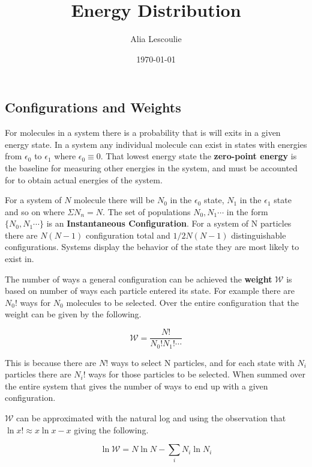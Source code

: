\documentclass[a4paper, 12 pt]{article}
\author{Alia Lescoulie}
\title{\vspace{-1.5cm}Energy Distribution}
\date{\today}
\begin{document}
\maketitle
\begin{flushleft}
\section{Configurations and Weights}

For molecules in a system there is a probability that is will exits in a given energy state. In a system any individual molecule can exist in states with energies from $\epsilon_0$ to $\epsilon_1$ where $\epsilon_0 \equiv 0$. That lowest energy state the \textbf{zero-point energy} is the baseline for measuring other energies in the system, and must be accounted for to obtain actual energies of the system.

For a system of $N$ molecule there will be $N_0$ in the $\epsilon_0$ state, $N_1$ in the $\epsilon_1$ state and so on where $\Sigma N_n = N$. The set of populations $N_0, N_1 \cdots$ in the form $\{ N_0, N_1 \cdots \}$ is an \textbf{Instantaneous Configuration}. For a system of N particles there are $N(N - 1)$ configuration total and $1/2 N(N - 1)$ distinguishable configurations. Systems display the behavior of the state they are most likely to exist in.

The number of ways a general configuration can be achieved the \textbf{weight} $\mathscr{W}$ is based on number of ways each particle entered its state. For example there are $N_0 !$ ways for $N_0$ molecules to be selected. Over the entire configuration that the weight can be given by the following.

\begin{equation*}
    \mathscr{W} = \frac{N!}{N_0 ! N_1 ! \cdots}
\end{equation*}

This is because there are $N!$ ways to select N particles, and for each state with $N_i$ particles there are $N_i !$ ways for those particles to be selected. When summed over the entire system that gives the number of ways to end up with a given configuration.

$\mathscr{W}$ can be approximated with the natural log and using the observation that $\ln{x!} \approx x\ln{x} - x$ giving the following.

\begin{equation*}
    \ln{\mathscr{W}} = N \ln{N} - \sum_i N_i \ln{N_i}
\end{equation*}


\end{flushleft}
\end{document}
